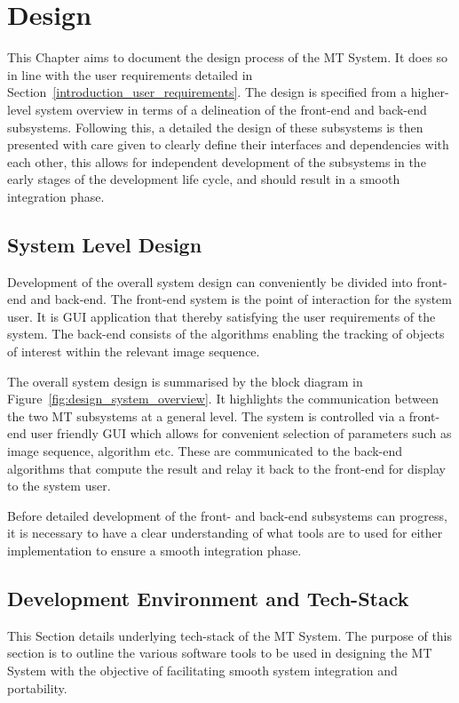 \chapter{Design}\label{chapter_design}
This Chapter aims to document the design process of the MT System. It does so
in line with the user requirements detailed in 
Section~\ref{introduction_user_requirements}. 
The design is specified from a higher-level system overview in terms of a
delineation of the front-end and back-end subsystems. Following this, a detailed the design of
these subsystems is then presented with care given to clearly define their
interfaces and dependencies with each other, this allows for independent
development of the subsystems in the early stages of the development life cycle,
and should result in a smooth integration phase.

\section{System Level Design}
Development of the overall system design can conveniently be divided into
front-end and back-end. The front-end system is the point of interaction for the
system user. It is GUI application that thereby satisfying the user requirements
of the system. The back-end consists of the algorithms enabling the tracking of
objects of interest within the relevant image sequence.

The overall system design is summarised by the block diagram in
Figure~\ref{fig:design_system_overview}. It highlights the communication between the
two MT subsystems at a general level. The system is controlled via a front-end user
friendly GUI which allows for convenient selection of parameters such as
image sequence, algorithm etc. These are communicated to the back-end
algorithms that compute the result and relay it back to the front-end for display to
the system user.


Before detailed development of the front- and back-end subsystems can progress, it is necessary to
have a clear understanding of what tools are to used for either implementation to
ensure a smooth integration phase.

\section{Development Environment and Tech-Stack}
This Section details underlying tech-stack of the MT System. The
purpose of this section is to outline the various software tools to be used in
designing the MT System with the objective of facilitating smooth system integration and
portability. 

